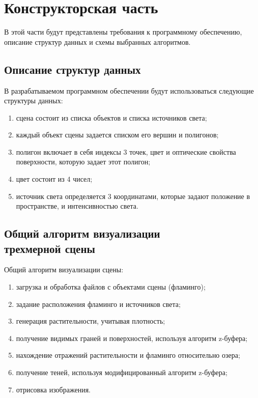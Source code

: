\chapter{Конструкторская часть}

В этой части будут представлены требования к программному обеспечению, описание структур данных и схемы выбранных алгоритмов.

\section{Описание структур данных}

В разрабатываемом программном обеспечении будут использоваться следующие структуры данных:
\begin{enumerate}[label=\arabic*)]
	\item сцена состоит из списка объектов и списка источников света;
	\item каждый объект сцены задается списком его вершин и полигонов;
	\item полигон включает в себя индексы 3 точек, цвет и оптические свойства поверхности, которую задает этот полигон;
	\item цвет состоит из 4 чисел;
	\item источник света определяется 3 координатами, которые задают положение в пространстве, и интенсивностью света.
\end{enumerate}

\section[Общий алгоритм визуализации трехмерной сцены]{Общий алгоритм визуализации\\трехмерной сцены}

Общий алгоритм визуализации сцены:
\begin{enumerate}[label=\arabic*)]
	\item загрузка и обработка файлов с объектами сцены (фламинго);
	\item задание расположения фламинго и источников света;
	\item генерация растительности, учитывая плотность;
	\item получение видимых граней и поверхностей, используя алгоритм z-буфера;
	\item нахождение отражений растительности и фламинго относительно озера;
	\item получение теней, используя модифицированный алгоритм z-буфера;
	\item отрисовка изображения.
\end{enumerate}

